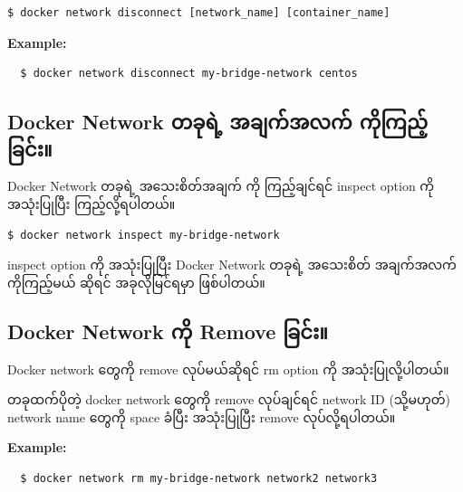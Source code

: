 \begin{verbatim}
$ docker network disconnect [network_name] [container_name]
\end{verbatim}

\textbf{Example:}

\begin{verbatim}
  $ docker network disconnect my-bridge-network centos
\end{verbatim}

\hypertarget{docker-network-ux1010ux1001ux102fux101bux1032ux1037-ux1021ux1001ux103bux1000ux103aux1021ux101cux1000ux103a-ux1000ux102dux102fux1000ux103cux100aux1037ux103aux1001ux103cux1004ux103aux1038-1}{%
\subsection{Docker Network တခုရဲ့ အချက်အလက်
ကိုကြည့်ခြင်း။}\label{docker-network-ux1010ux1001ux102fux101bux1032ux1037-ux1021ux1001ux103bux1000ux103aux1021ux101cux1000ux103a-ux1000ux102dux102fux1000ux103cux100aux1037ux103aux1001ux103cux1004ux103aux1038-1}}

Docker Network တခုရဲ့ အသေးစိတ်အချက် ကို ကြည့်ချင်ရင် inspect option ကို
အသုံးပြုပြီး ကြည့်လို့ရပါတယ်။

\begin{verbatim}
$ docker network inspect my-bridge-network
\end{verbatim}

inspect option ကို အသုံးပြုပြီး Docker Network တခုရဲ့ အသေးစိတ်
အချက်အလက်ကိုကြည့်မယ် ဆိုရင် အခုလိုမြင်ရမှာ ဖြစ်ပါတယ်။

\hypertarget{docker-network-ux1000ux102dux102f-remove-ux1001ux103cux1004ux103aux1038-1}{%
\subsection{Docker Network ကို Remove
ခြင်း။}\label{docker-network-ux1000ux102dux102f-remove-ux1001ux103cux1004ux103aux1038-1}}

Docker network တွေကို remove လုပ်မယ်ဆိုရင် rm option ကို
အသုံးပြုလို့ပါတယ်။

တခုထက်ပိုတဲ့ docker network တွေကို remove လုပ်ချင်ရင် network ID
(သို့မဟုတ်) network name တွေကို space ခံပြီး အသုံးပြုပြီး remove
လုပ်လို့ရပါတယ်။

\textbf{Example:}

\begin{verbatim}
  $ docker network rm my-bridge-network network2 network3
\end{verbatim}

